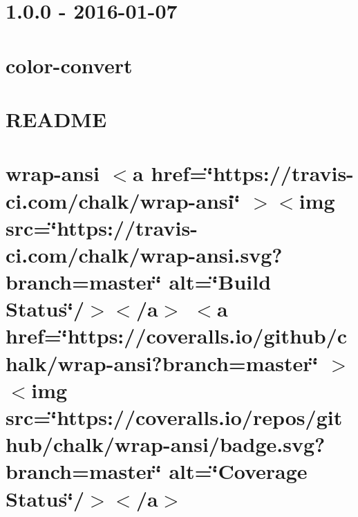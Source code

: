 \documentclass[twoside]{book}
\newcommand{\+}{\discretionary{\mbox{\scriptsize$\hookleftarrow$}}{}{}}
\begin{document}
\chapter{1.0.0 -\/ 2016-\/01-\/07}
\label{md__c___users_vaishnavi_jadhav__desktop__developer_code_mean_stack_example_client_node_modules_w7c3670870a90cf46f1f21abbcfa55161}

\chapter{color-\/convert}
\label{md__c___users_vaishnavi_jadhav__desktop__developer_code_mean_stack_example_client_node_modules_w27317604fc255ebc4e422e948d0b8910}

\chapter{README}
\label{md__c___users_vaishnavi_jadhav__desktop__developer_code_mean_stack_example_client_node_modules_w1f1c88827934c2c3285a42976f0e39b8}

\chapter{wrap-\/ansi \texorpdfstring{$<$}{<}a href=\char`\"{}https\+://travis-\/ci.\+com/chalk/wrap-\/ansi\char`\"{} \texorpdfstring{$>$}{>}\texorpdfstring{$<$}{<}img src=\char`\"{}https\+://travis-\/ci.\+com/chalk/wrap-\/ansi.\+svg?branch=master\char`\"{} alt=\char`\"{}\+Build Status\char`\"{}/\texorpdfstring{$>$}{>}\texorpdfstring{$<$}{<}/a\texorpdfstring{$>$}{>} \texorpdfstring{$<$}{<}a href=\char`\"{}https\+://coveralls.\+io/github/chalk/wrap-\/ansi?branch=master\char`\"{} \texorpdfstring{$>$}{>}\texorpdfstring{$<$}{<}img src=\char`\"{}https\+://coveralls.\+io/repos/github/chalk/wrap-\/ansi/badge.\+svg?branch=master\char`\"{} alt=\char`\"{}\+Coverage Status\char`\"{}/\texorpdfstring{$>$}{>}\texorpdfstring{$<$}{<}/a\texorpdfstring{$>$}{>}}
\label{md__c___users_vaishnavi_jadhav__desktop__developer_code_mean_stack_example_client_node_modules_wrap_ansi_readme}

\end{document}
